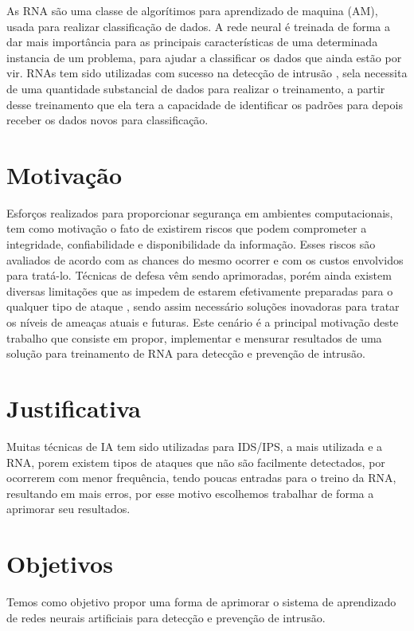 \documentclass[
	12pt,				%
	openright,			%
	oneside,
	a4paper,			%
	english,			%
	french,				%
	spanish,			%
	brazil				%
	]{abntex2}
\begin{document}
As RNA são uma classe de algorítimos para aprendizado de maquina (AM), usada para realizar classificação de dados. A rede neural é treinada de forma a dar mais importância para as principais características de uma determinada instancia de um problema, para ajudar a classificar os dados que ainda estão por vir. 
RNAs tem sido utilizadas com sucesso na detecção de intrusão \cite{Zhang} \cite{Tong} \cite{Wonil}, sela necessita de uma quantidade substancial de dados para realizar o treinamento, a partir desse treinamento que ela tera a capacidade de identificar os padrões para depois receber os dados novos para classificação.


\section{Motivação}

Esforços realizados para proporcionar segurança em ambientes computacionais, tem como motivação o fato de existirem riscos que podem comprometer a integridade, confiabilidade e disponibilidade da informação. 
Esses riscos são avaliados de acordo com as chances do mesmo ocorrer e com os custos envolvidos para tratá-lo. Técnicas de defesa vêm sendo aprimoradas, porém ainda existem diversas limitações que as impedem de estarem efetivamente preparadas para o qualquer tipo de ataque \cite{CeC}, sendo assim necessário  soluções inovadoras para tratar os níveis de ameaças atuais e futuras. 
Este cenário é a principal motivação deste trabalho que consiste em propor, implementar e mensurar resultados de uma solução para treinamento de RNA para detecção e prevenção de intrusão.

\section{Justificativa}

Muitas técnicas de IA tem sido utilizadas para IDS/IPS, a mais utilizada e a RNA\cite{Stampar}, porem existem tipos de ataques que não são facilmente detectados, por ocorrerem com menor frequência, tendo poucas entradas para o treino da RNA\cite{CeC}, resultando em mais erros,  por esse motivo escolhemos trabalhar de forma a aprimorar seu resultados.


\section{Objetivos}

Temos como objetivo propor uma forma de aprimorar o sistema de aprendizado de redes neurais artificiais para detecção e prevenção de intrusão.
\end{document}
